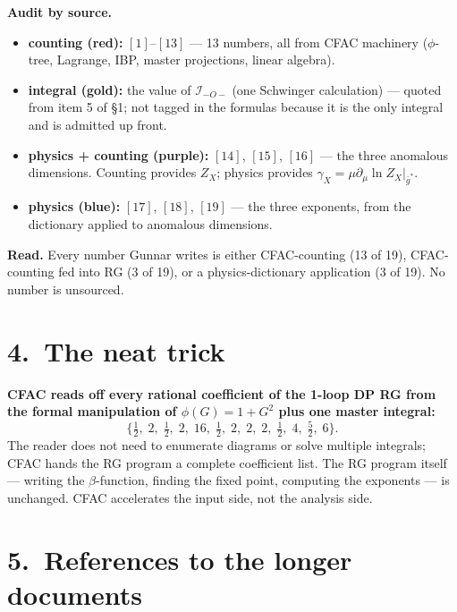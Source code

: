 \documentclass[11pt,a4paper]{article}
\newcommand{\ck}[1]{\textcolor{cntcol}{$[#1]$}}
\newcommand{\pk}[1]{\textcolor{phycol}{$[#1]$}}
\newcommand{\mk}[1]{\textcolor{mixcol}{$[#1]$}}
\begin{document}
\medskip
\noindent\textbf{Audit by source.}
\begin{itemize}[itemsep=2pt,leftmargin=1.5em]
\item \textcolor{cntcol}{\textbf{counting (red):}} \ck{1}--\ck{13} --- 13 numbers, all from
CFAC machinery ($\phi$-tree, Lagrange, IBP, master projections, linear algebra).
\item \textcolor{intcol}{\textbf{integral (gold):}} the value of $\mathcal I_{-O-}$ (one
Schwinger calculation) --- quoted from item 5 of \S 1; not tagged in the formulas because it
is the only integral and is admitted up front.
\item \textcolor{mixcol}{\textbf{physics + counting (purple):}} \mk{14}, \mk{15}, \mk{16}
--- the three anomalous dimensions. Counting provides $Z_{X}$; physics provides
$\gamma_{X} = \mu\partial_{\mu}\ln Z_{X}|_{\bar g^{*}}$.
\item \textcolor{phycol}{\textbf{physics (blue):}} \pk{17}, \pk{18}, \pk{19} --- the three
exponents, from the dictionary applied to anomalous dimensions.
\end{itemize}

\noindent\textbf{Read.} Every number Gunnar writes is either CFAC-counting (13 of 19),
CFAC-counting fed into RG (3 of 19), or a physics-dictionary application (3 of 19). No
number is unsourced.

\section*{4.\ The neat trick}

\textbf{CFAC reads off every rational coefficient of the 1-loop DP RG from the formal
manipulation of $\phi(G)=1+G^{2}$ plus one master integral:}
\[
\bigl\{\tfrac{1}{2},\;2,\;\tfrac{1}{2},\;2,\;16,\;\tfrac{1}{2},\;2,\;2,\;2,\;\tfrac{1}{2},\;4,\;\tfrac{5}{2},\;6\bigr\}.
\]
The reader does not need to enumerate diagrams or solve multiple integrals; CFAC hands
the RG program a complete coefficient list. The RG program itself --- writing the
$\beta$-function, finding the fixed point, computing the exponents --- is unchanged.
CFAC accelerates the input side, not the analysis side.

\section*{5.\ References to the longer documents}
\end{document}
